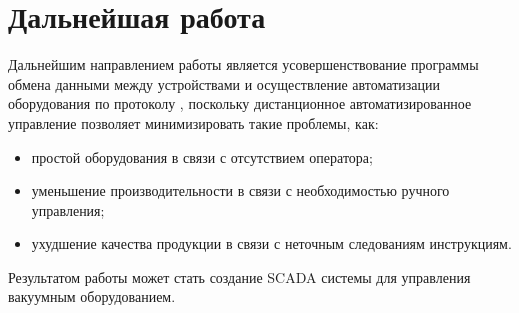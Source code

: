 \documentclass[../../AISTR.tex]{subfiles}
\begin{document}
\section{Дальнейшая работа}
Дальнейшим направлением работы является усовершенствование программы обмена данными между устройствами и осуществление автоматизации оборудования по протоколу \mb \tcp, поскольку дистанционное автоматизированное управление позволяет минимизировать такие проблемы, как:
\begin{itemize}
	\item простой оборудования в связи с отсутствием оператора;
	\item уменьшение производительности в связи с необходимостью ручного управления;
	\item ухудшение качества продукции в связи с неточным следованиям инструкциям.
\end{itemize}

Результатом работы может стать создание SCADA системы для управления вакуумным оборудованием.
\end{document}
